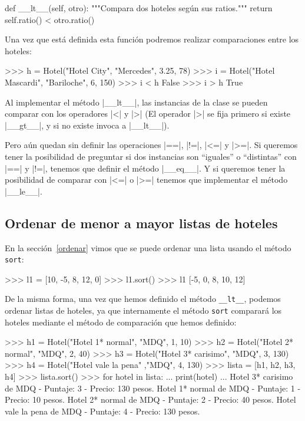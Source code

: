 \begin{codigo-python-sn}
    def __lt__(self, otro):
        """Compara dos hoteles según sus ratios."""
        return self.ratio() < otro.ratio()
\end{codigo-python-sn}

Una vez que está definida esta función podremos realizar comparaciones
entre los hoteles:

\begin{codigo-python-sn}
>>> h = Hotel("Hotel City", "Mercedes", 3.25, 78)
>>> i = Hotel("Hotel Mascardi", "Bariloche", 6, 150)
>>> i < h
False
>>> i > h
True
\end{codigo-python-sn}

Al implementar el método |__lt__|, las instancias de la clase se pueden
comparar con los operadores |<| y |>| (El operador |>| se fija primero si
existe |__gt__|, y si no existe invoca a |__lt__|).

Pero aún quedan sin definir las operaciones |==|, |!=|, |<=| y |>=|.  Si
queremos tener la posibilidad de preguntar si dos instancias son ``iguales'' o
``distintas'' con |==| y |!=|, tenemos que definir el método |__eq__|. Y si
queremos tener la posibilidad de comparar con |<=| o |>=| tenemos que
implementar el método |__le__|.

\subsection{Ordenar de menor a mayor listas de hoteles}

En la sección~\ref{ordenar} vimos que se puede ordenar una lista usando el
método \lstinline!sort!:

\begin{codigo-python-sn}
>>> l1 = [10, -5, 8, 12, 0]
>>> l1.sort()
>>> l1
[-5, 0, 8, 10, 12]
\end{codigo-python-sn}

De la misma forma, una vez que hemos definido el método
\lstinline!__lt__!, podemos ordenar listas de hoteles, ya que
internamente el método \lstinline!sort! comparará los hoteles mediante
el método de comparación que hemos definido:

\begin{codigo-python-sn}
>>> h1 = Hotel("Hotel 1* normal", "MDQ", 1, 10)
>>> h2 = Hotel("Hotel 2* normal", "MDQ", 2, 40)
>>> h3 = Hotel("Hotel 3* carisimo", "MDQ", 3, 130)
>>> h4 = Hotel("Hotel vale la pena" ,"MDQ", 4, 130)
>>> lista = [h1, h2, h3, h4]
>>> lista.sort()
>>> for hotel in lista:
...     print(hotel)
...
Hotel 3* carisimo de MDQ - Puntaje: 3 - Precio: 130 pesos.
Hotel 1* normal de MDQ - Puntaje: 1 - Precio: 10 pesos.
Hotel 2* normal de MDQ - Puntaje: 2 - Precio: 40 pesos.
Hotel vale la pena de MDQ - Puntaje: 4 - Precio: 130 pesos.
\end{codigo-python-sn}

